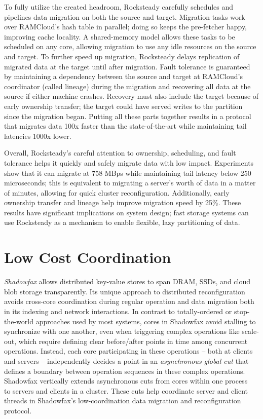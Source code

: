 To fully utilize the created headroom, Rocksteady carefully schedules and
pipelines data migration on both the source and target.
%
Migration tasks work over RAMCloud’s hash table in parallel;
doing so keeps the pre-fetcher happy, improving cache locality.
%
A shared-memory model allows these tasks to be scheduled on any core,
allowing migration to use any idle resources on the source and target.
%
To further speed up migration, Rocksteady delays
replication of migrated data at the target until after migration.
%
Fault tolerance is guaranteed by maintaining a dependency
between the source and target at RAMCloud’s coordinator (called lineage)
during the migration and recovering all data at the source if either
machine crashes.
%
Recovery must also include the target because of early
ownership transfer; the target could have served writes
to the partition since the migration began.
%
Putting all these parts
together results in a protocol that migrates data 100x faster than the
state-of-the-art while maintaining tail latencies 1000x lower.

Overall, Rocksteady's careful attention to ownership, scheduling, and
fault tolerance helps it quickly and safely migrate data with
low impact.
%
Experiments show that it can migrate at 758 MBps
while maintaining tail latency below 250 microseconds; this is
equivalent to migrating a server's worth of data in a matter of minutes,
allowing for quick cluster reconfiguration.
%
Additionally, early ownership transfer and
lineage help improve migration speed by 25\%.
%
These results have
significant implications on system design; fast storage systems can use
Rocksteady as a mechanism to enable flexible, lazy partitioning of
data.

\section{Low Cost Coordination}

\emph{Shadowfax} allows distributed key-value stores to
span DRAM, SSDs, and cloud blob storage transparently.
%
Its unique approach to
distributed reconfiguration avoids cross-core coordination during
regular operation and data migration both in its indexing and network
interactions.
%
In contrast to totally-ordered or stop-the-world approaches used by most
systems, cores in Shadowfax avoid stalling to synchronize with one another, even when
triggering complex operations like scale-out, which require
defining clear before/after points in time among concurrent operations.
%
Instead, each core participating in these operations -- both at clients and
servers -- independently decides a point in an \emph{asynchronous global
cut} that defines a boundary between operation sequences in these complex operations.
%
Shadowfax vertically extends asynchronous cuts from cores within one
process~\cite{faster} to servers
and clients in a cluster.
%
These cuts help coordinate server
and client threads
in Shadowfax's low-coordination data migration and
reconfiguration protocol.

